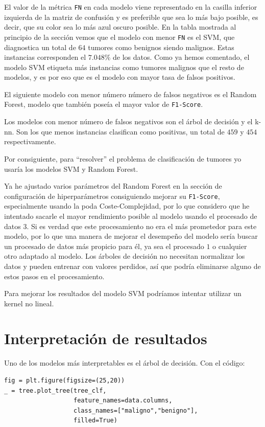 \documentclass[a4]{article}
\begin{document}
El valor de la métrica \texttt{FN} en cada modelo viene representado en la casilla inferior izquierda de la matriz de confusión y es preferible que sea lo más bajo posible, es decir, que su color sea lo más azul oscuro posible. En la tabla mostrada al principio de la sección vemos que el modelo con menor \texttt{FN} es el SVM, que diagnostica un total de $64$ tumores como benignos siendo malignos. Estas instancias corresponden el $7.048\%$ de los datos. Como ya hemos comentado, el modelo SVM etiqueta más instancias como tumores malignos que el resto de modelos, y es por eso que es el modelo con mayor tasa de falsos positivos.

El siguiente modelo con menor número número de falsos negativos es el Random Forest, modelo que también poseía el mayor valor de \texttt{F1-Score}.

Los modelos con menor número de falsos negativos son el árbol de decisión y el k-nn. Son los que menos instancias clasifican como positivas, un total de $459$ y $454$ respectivamente.

Por consiguiente, para ``resolver'' el problema de clasificación de tumores yo usaría los modelos SVM y Random Forest.

Ya he ajustado varios parámetros del Random Forest en la sección de configuración de hiperparámetros consiguiendo mejorar su \texttt{F1-Score}, especialmente usando la poda Coste-Complejidad, por lo que considero que he intentado sacarle el mayor rendimiento posible al modelo usando el procesado de datos $3$. Si es verdad que este procesamiento no era el más prometedor para este modelo, por lo que una manera de mejorar el desempeño del modelo sería buscar un procesado de datos más propicio para él, ya sea el procesado $1$ o cualquier otro adaptado al modelo. Los árboles de decisión no necesitan normalizar los datos y pueden entrenar con valores perdidos, así que podría eliminarse alguno de estos pasos en el procesamiento.

Para mejorar los resultados del modelo SVM podríamos intentar utilizar un kernel no lineal.

\newpage
\section{Interpretación de resultados}

Uno de los modelos más interpretables es el árbol de decisión. Con el código:

\begin{lstlisting}
fig = plt.figure(figsize=(25,20))
_ = tree.plot_tree(tree_clf, 
                   feature_names=data.columns,  
                   class_names=["maligno","benigno"],
                   filled=True)

\end{lstlisting}
\end{document}
